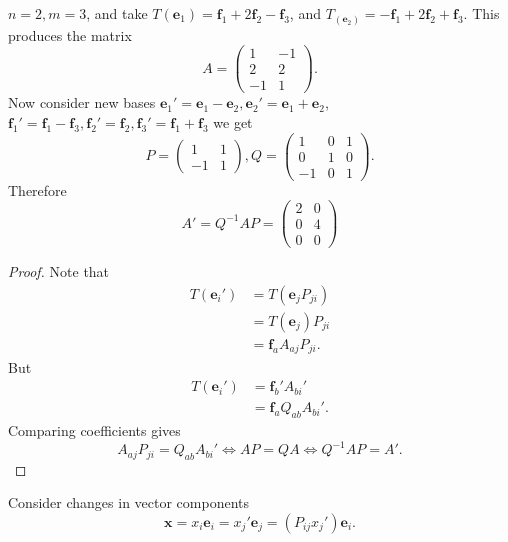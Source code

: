 \documentclass[a4paper]{article}
\begin{document}
    \begin{example}
      $n=2,m=3$, and take $ T(\mathbf{e}_1) =
      \mathbf{f}_1+2\mathbf{f}_2-\mathbf{f}_3 $, and $
      T_(\mathbf{e}_2)=-\mathbf{f}_1+2\mathbf{f}_2+\mathbf{f}_3 $.
      This produces the matrix
      \[
        A=
        \begin{pmatrix}
          1&-1\\
          2&2\\
          -1&1
        \end{pmatrix}.
      \]
      Now consider new bases $
      \mathbf{e}_1'=\mathbf{e}_1-\mathbf{e}_2,
      \mathbf{e}_2'=\mathbf{e}_1+\mathbf{e}_2 $, $ \mathbf{f}_1'=
      \mathbf{f}_1-\mathbf{f}_3, \mathbf{f}_2'=\mathbf{f}_2,
      \mathbf{f}_3'=\mathbf{f}_1+\mathbf{f}_3$ we get
      \[
        P=
        \begin{pmatrix}
          1&1\\
          -1&1
        \end{pmatrix},
        Q=
        \begin{pmatrix}
          1&0&1\\
          0&1&0\\
          -1&0&1
        \end{pmatrix}.
      \]
      Therefore
      \[
        A'=Q^{-1}AP=
        \begin{pmatrix}
          2&0\\
          0&4\\
          0&0
        \end{pmatrix}
      \]
    \end{example}
    \begin{proof}
      Note that
      \begin{align*}
        T(\mathbf{e}_i')&= T(\mathbf{e}_jP_{ji})\\
        &=T(\mathbf{e}_j)P_{ji}\\
        &= \mathbf{f}_aA_{aj}P_{ji}.
      \end{align*}
      But
      \begin{align*}
        T(\mathbf{e}_i')&= \mathbf{f}_b' A_{bi}'\\
        &= \mathbf{f}_aQ_{ab}A_{bi}'.
      \end{align*}
      Comparing coefficients gives
      \[
        A_{aj}P_{ji}=Q_{ab}A_{bi}' \Longleftrightarrow AP=QA
        \Longleftrightarrow Q^{-1}AP=A'.
      \]
    \end{proof}
    Consider changes in vector components
    \[
      \mathbf{x} = x_i\mathbf{e}_i = x_j'\mathbf{e}_j =
      (P_{ij}x_j')\mathbf{e}_i.
    \]
\end{document}
